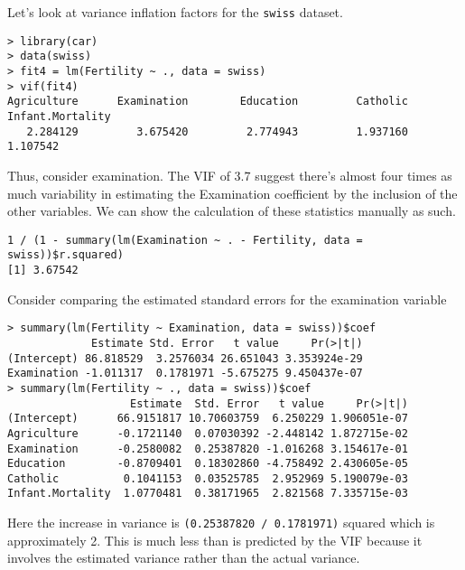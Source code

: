 Let's look at variance inflation factors for the \texttt{swiss} dataset.
\begin{verbatim}
> library(car)
> data(swiss)
> fit4 = lm(Fertility ~ ., data = swiss)
> vif(fit4)
Agriculture      Examination        Education         Catholic Infant.Mortality 
   2.284129         3.675420         2.774943         1.937160         1.107542 
\end{verbatim}
Thus, consider examination. The VIF of 3.7 suggest there's almost four times as
much variability in estimating the Examination coefficient by the inclusion of the
other variables. We can show the calculation of these statistics manually as such.

\begin{verbatim}
1 / (1 - summary(lm(Examination ~ . - Fertility, data = swiss))$r.squared)
[1] 3.67542
\end{verbatim}

Consider comparing the estimated standard errors for the examination variable
\begin{verbatim}
> summary(lm(Fertility ~ Examination, data = swiss))$coef
             Estimate Std. Error   t value     Pr(>|t|)
(Intercept) 86.818529  3.2576034 26.651043 3.353924e-29
Examination -1.011317  0.1781971 -5.675275 9.450437e-07
> summary(lm(Fertility ~ ., data = swiss))$coef
                   Estimate  Std. Error   t value     Pr(>|t|)
(Intercept)      66.9151817 10.70603759  6.250229 1.906051e-07
Agriculture      -0.1721140  0.07030392 -2.448142 1.872715e-02
Examination      -0.2580082  0.25387820 -1.016268 3.154617e-01
Education        -0.8709401  0.18302860 -4.758492 2.430605e-05
Catholic          0.1041153  0.03525785  2.952969 5.190079e-03
Infant.Mortality  1.0770481  0.38171965  2.821568 7.335715e-03
\end{verbatim}
Here the increase in variance is \texttt{(0.25387820 / 0.1781971)} squared which is approximately
2. This is much less than is predicted by the VIF because it involves the estimated
variance rather than the actual variance. 


